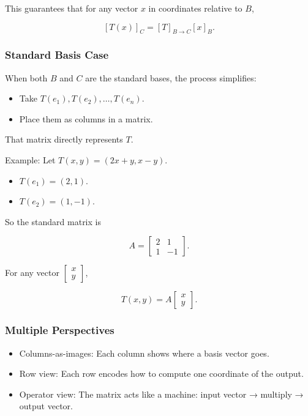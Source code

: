 \documentclass[
  letterpaper,
  DIV=11,
  numbers=noendperiod]{scrreprt}
\providecommand{\tightlist}{%
  \setlength{\itemsep}{0pt}\setlength{\parskip}{0pt}}
\begin{document}
This guarantees that for any vector \(x\) in coordinates relative to
\(B\),

\[
[T(x)]_C = [T]_{B \to C}[x]_B.
\]

\subsubsection{Standard Basis Case}\label{standard-basis-case}

When both \(B\) and \(C\) are the standard bases, the process
simplifies:

\begin{itemize}
\tightlist
\item
  Take \(T(e_1), T(e_2), \dots, T(e_n)\).
\item
  Place them as columns in a matrix.
\end{itemize}

That matrix directly represents \(T\).

Example: Let \(T(x,y) = (2x+y, x-y)\).

\begin{itemize}
\tightlist
\item
  \(T(e_1) = (2,1)\).
\item
  \(T(e_2) = (1,-1)\).
\end{itemize}

So the standard matrix is

\[
A = \begin{bmatrix} 2 & 1 \\ 1 & -1 \end{bmatrix}.
\]

For any vector \(\begin{bmatrix} x \\ y \end{bmatrix}\),

\[
T(x,y) = A \begin{bmatrix} x \\ y \end{bmatrix}.
\]

\subsubsection{Multiple Perspectives}\label{multiple-perspectives}

\begin{itemize}
\tightlist
\item
  Columns-as-images: Each column shows where a basis vector goes.
\item
  Row view: Each row encodes how to compute one coordinate of the
  output.
\item
  Operator view: The matrix acts like a machine: input vector → multiply
  → output vector.
\end{itemize}
\end{document}
